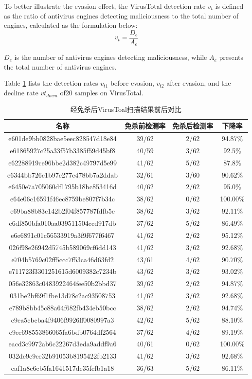 To better illustrate the evasion effect, the VirusTotal detection rate $v_t$ is defined as the ratio of antivirus engines detecting maliciousness to the total number of engines, calculated as the formulation below:
\begin{equation}
v_t = \frac{D_e}{A_e}
\tag{5.9}
\end{equation}

$D_e$ is the number of antivirus engines detecting maliciousness, while $A_e$ presents the total number of antivirus engines.

Table \ref{tab:5.13} lists the detection rates $v_{t1}$ before evasion, $v_{t2}$ after evasion, and the decline rate $vt_{down}$ of20 samples on VirusTotal.

\begin{table}[htbp]
	\centering
	\caption{经免杀后VirusToal扫描结果前后对比}
	\label{tab:5.13}
	\begin{tabular*}{0.9\textwidth}{@{\extracolsep{\fill}}cccc}
		\toprule
		名称 & 免杀前检测率 & 免杀后检测率 & 下降率 \\
		\midrule
		e601de9bb0828bae5eec828547d18e84 & 39/62 & 2/62 & 94.87\% \\
		e61865927c25a33f57b3385f59d45bf8 & 40/59 & 3/62 & 92.5\% \\
		e62288919ce96bbe2d382c49797d5e99 & 41/62 & 5/62 & 87.8\% \\
		e6344bb726c1b97e277c478bb7a2ddab & 32/61 & 3/60 & 90.62\% \\
		e6450e7a705060df1795b18bc853416d & 40/62 & 2/62 & 95.0\% \\
		e64e06c16591f46ec8759be807f7b34c & 38/62 & 0/62 & 100.00\% \\
		e69ba88b83c142b2f04f857787fdfb5e & 38/62 & 3/62 & 92.11\% \\
		e6df850bfa010aa039511504ccd917db & 37/62 & 5/62 & 86.49\% \\
		e6e6891c01c56533919a3f9f677f6467 & 41/62 & 2/62 & 95.12\% \\
		026f98e26942d5745b589069cf6dd143 & 41/62 & 3/62 & 92.68\% \\
		e704b5769c02ff5ccc7f53ca46d63fd2 & 43/61 & 4/62 & 90.70\% \\
		e711723f3301251615d6009382c7234b & 43/62 & 3/62 & 93.02\% \\
		056e32863c0483922464fee50b2bbd37 & 39/62 & 2/62 & 94.87\% \\
		031be2bf69f1fbe13d78c2ac93508753 & 41/62 & 3/62 & 92.68\% \\
		e789b8bb45c88a64f682fb434eb50bcc & 38/62 & 2/62 & 94.74\% \\
		e9ea5cbcba4f9406f9926ff0080997a3 & 42/62 & 5/62 & 88.10\% \\
		e9ee698553866065fa6bdb0764df2564 & 37/62 & 4/62 & 89.19\% \\
		eacd3c9972ab6c22267d3eda9addf9a6 & 40/61 & 0/62 & 100.00\% \\
		032de9e9ee32b91053b8195422fb2133 & 41/62 & 3/62 & 92.68\% \\
		eaf1a8c6eb5fa1641517de35fefb1a18 & 36/63 & 5/62 & 86.11\% \\
		\bottomrule
	\end{tabular*}
\end{table}

